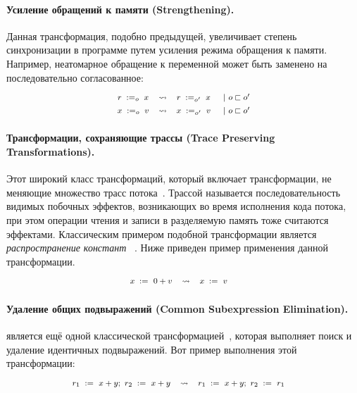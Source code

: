 \paragraph{
Усиление обращений к памяти
(Strengthening).
}

Данная трансформация, подобно предыдущей, 
увеличивает степень синхронизации в программе 
путем усиления режима обращения к памяти.
Например, неатомарное обращение к переменной  может быть заменено на 
последовательно согласованное: 
%
\[\def\arraystretch{1.4}\footnotesize
  \begin{array}{cccl} 

      \readInst{o}{r}{x} 
    & \leadsto 
    & \readInst{o'}{r}{x}
    & ~|~ o \sqsubset o' \\ 

      \writeInst{o}{x}{v}
    & \leadsto 
    & \writeInst{o'}{x}{v}
    & ~|~ o \sqsubset o'  \\ 

  \end{array}
\]

\paragraph{
Трансформации, сохраняющие трассы
(Trace Preserving Transformations).
}

Этот широкий класс трансформаций, который включает трансформации, 
не меняющие множество трасс потока~\cite{Sevcik-Aspinall:ECOOP08}.
Трассой называется последовательность видимых побочных эффектов,
возникающих во время исполнения кода потока, при этом 
операции чтения и записи в разделяемую память тоже считаются эффектами.
Классическим примером подобной трансформации является \emph{распространение констант}%
~\cite{Muchnick:ACDI97, Wegman-Zadeck:TOPLAS91}.
Ниже приведен пример применения данной трансформации. 
%
\[\def\arraystretch{1.4}\footnotesize
  \begin{array}{cccl} 

      \writeInst{}{x}{0 + v} 
    & \leadsto 
    & \writeInst{}{x}{v}
    & \\ 

  \end{array}
\]
  
\paragraph{
Удаление общих подвыражений
(Common Subexpression Elimination).
}

\CSE является ещё одной классической трансформацией~\cite{Muchnick:ACDI97}, 
которая выполняет поиск и удаление идентичных подвыражений.
Вот пример выполнения этой трансформации:
%
\[\def\arraystretch{1.4}\footnotesize
  \begin{array}{cccl} 

      \readInst{}{r_1}{x + y} \seq \readInst{}{r_2}{x + y} 
    & \leadsto 
    & \readInst{}{r_1}{x + y} \seq \readInst{}{r_2}{r_1}
    & \\ 

  \end{array}
\]

